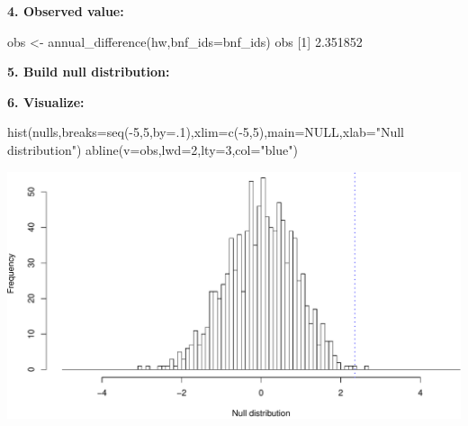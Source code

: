 \documentclass[
]{book}
\newenvironment{Shaded}{\begin{snugshade}}{\end{snugshade}}
\newcommand{\AttributeTok}[1]{\textcolor[rgb]{0.77,0.63,0.00}{#1}}
\newcommand{\ConstantTok}[1]{\textcolor[rgb]{0.00,0.00,0.00}{#1}}
\newcommand{\ControlFlowTok}[1]{\textcolor[rgb]{0.13,0.29,0.53}{\textbf{#1}}}
\newcommand{\DecValTok}[1]{\textcolor[rgb]{0.00,0.00,0.81}{#1}}
\newcommand{\FloatTok}[1]{\textcolor[rgb]{0.00,0.00,0.81}{#1}}
\newcommand{\FunctionTok}[1]{\textcolor[rgb]{0.00,0.00,0.00}{#1}}
\newcommand{\NormalTok}[1]{#1}
\newcommand{\OtherTok}[1]{\textcolor[rgb]{0.56,0.35,0.01}{#1}}
\newcommand{\SpecialCharTok}[1]{\textcolor[rgb]{0.00,0.00,0.00}{#1}}
\newcommand{\StringTok}[1]{\textcolor[rgb]{0.31,0.60,0.02}{#1}}
\begin{document}
\textbf{4. Observed value:}

\begin{Shaded}
\begin{Highlighting}[]
\NormalTok{obs }\OtherTok{\textless{}{-}} \FunctionTok{annual\_difference}\NormalTok{(hw,}\AttributeTok{bnf\_ids=}\NormalTok{bnf\_ids)}
\NormalTok{obs }
\NormalTok{[}\DecValTok{1}\NormalTok{] }\FloatTok{2.351852}
\end{Highlighting}
\end{Shaded}

\textbf{5. Build null distribution:}

\begin{Shaded}
\end{Shaded}

\textbf{6. Visualize:}

\begin{Shaded}
\begin{Highlighting}[]
\FunctionTok{hist}\NormalTok{(nulls,}\AttributeTok{breaks=}\FunctionTok{seq}\NormalTok{(}\SpecialCharTok{{-}}\DecValTok{5}\NormalTok{,}\DecValTok{5}\NormalTok{,}\AttributeTok{by=}\NormalTok{.}\DecValTok{1}\NormalTok{),}\AttributeTok{xlim=}\FunctionTok{c}\NormalTok{(}\SpecialCharTok{{-}}\DecValTok{5}\NormalTok{,}\DecValTok{5}\NormalTok{),}\AttributeTok{main=}\ConstantTok{NULL}\NormalTok{,}\AttributeTok{xlab=}\StringTok{"Null distribution"}\NormalTok{)}
\FunctionTok{abline}\NormalTok{(}\AttributeTok{v=}\NormalTok{obs,}\AttributeTok{lwd=}\DecValTok{2}\NormalTok{,}\AttributeTok{lty=}\DecValTok{3}\NormalTok{,}\AttributeTok{col=}\StringTok{"blue"}\NormalTok{)}
\end{Highlighting}
\end{Shaded}

\includegraphics{figures/unnamed-chunk-395-1.pdf}
\end{document}
